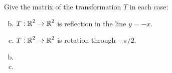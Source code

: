 \documentclass[../main.tex]{subfiles}
\begin{document}
Give the matrix of the transformation $T$ in each case:
\begin{enumerate}[a)]
	\setcounter{enumi}{1}
	\item $T: \operatorname{\mathbb{R}}^2 \to \operatorname{\mathbb{R}}^2$ is reflection in the line $y = -x$.
	\setcounter{enumi}{3}
	\item $T: \operatorname{\mathbb{R}}^2 \to \operatorname{\mathbb{R}}^2$ is rotation through $-\pi/2$.
\end{enumerate}

\solution
\begin{enumerate}[a)]
	\setcounter{enumi}{1}
	\item 
	\setcounter{enumi}{3}
	\item 
\end{enumerate}
\end{document}
